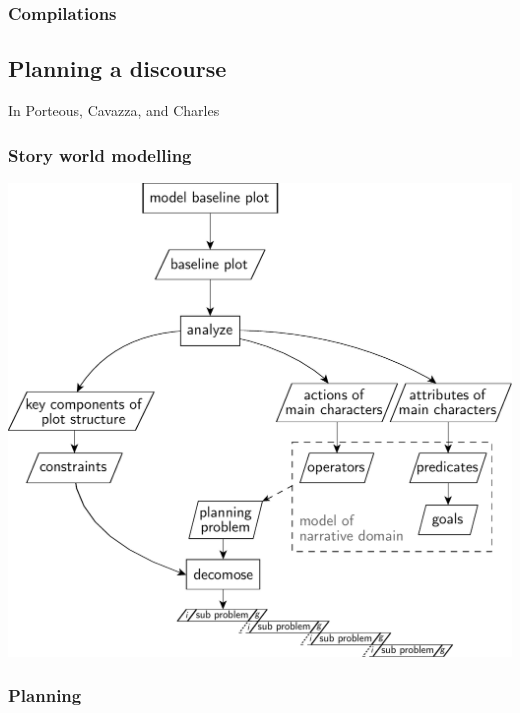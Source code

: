 \subsubsection{Compilations}
\subsection{Planning a discourse}\label{discourse}
In \cite{Porteous10} Porteous, Cavazza, and Charles
\subsubsection{Story world modelling}
\includegraphics[scale=0.6]{discourse_model}
\subsubsection{Planning}
